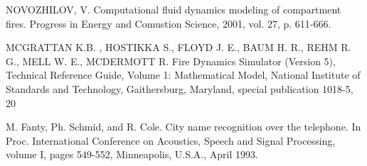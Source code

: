\begin{thebibliography}{99}

 NOVOZHILOV, V. Computational fluid dynamics modeling of compartment fires. Progress in Energy and Comustion Science, 2001, vol. 27, p. 611-666.

 MCGRATTAN K.B. , HOSTIKKA S., FLOYD J. E., BAUM H. R., REHM R. G.,
MELL W. E., MCDERMOTT R. Fire Dynamics Simulator (Version 5), Technical Reference Guide, Volume 1: Mathematical Model, National Institute of Standards and Technology, Gaithersburg, Maryland, special publication 1018-5, 20

 M. Fanty, Ph. Schmid, and R. Cole. City name recognition over the telephone. In Proc. International Conference on Acoustics, Speech and Signal Processing, volume I, pages 549-552, Minneapolis, U.S.A., April 1993. 

\end{thebibliography}
